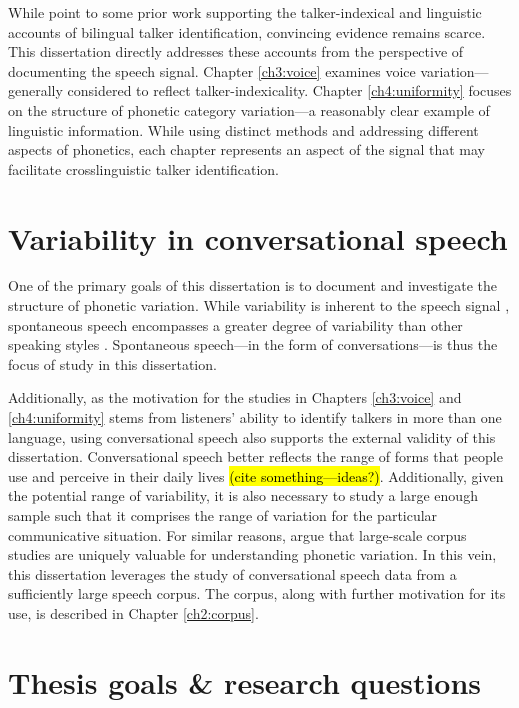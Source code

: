 While \citet{orena_2019_identifying} point to some prior work supporting the talker-indexical and linguistic accounts of bilingual talker identification, convincing evidence remains scarce. This dissertation directly addresses these accounts from the perspective of documenting the speech signal. Chapter \ref{ch3:voice} examines voice variation---generally considered to reflect talker-indexicality. Chapter \ref{ch4:uniformity} focuses on the structure of phonetic category variation---a reasonably clear example of linguistic information. While using distinct methods and addressing different aspects of phonetics, each chapter represents an aspect of the signal that may facilitate crosslinguistic talker identification. 

\section{Variability in conversational speech}\label{ch1:sec:spontaneous}

One of the primary goals of this dissertation is to document and investigate the structure of phonetic variation. While variability is inherent to the speech signal \citep[cf. the lack of invariance problem][]{liberman_1967_perception}, spontaneous speech encompasses a greater degree of variability than other speaking styles \citep[e.g., reduction phenomena:][]{johnson_2004_massive}. Spontaneous speech---in the form of conversations---is thus the focus of study in this dissertation. 

Additionally, as the motivation for the studies in Chapters \ref{ch3:voice} and \ref{ch4:uniformity} stems from listeners' ability to identify talkers in more than one language, using conversational speech also supports the external validity of this dissertation. Conversational speech better reflects the range of forms that people use and perceive in their daily lives \hl{(cite something---ideas?)}. Additionally, given the potential range of variability, it is also necessary to study a large enough sample such that it comprises the range of variation for the particular communicative situation. For similar reasons, \citet{tanner_2020_english} argue that large-scale corpus studies are uniquely valuable for understanding phonetic variation. In this vein, this dissertation leverages the study of conversational speech data from a sufficiently large speech corpus. The corpus, along with further motivation for its use, is described in Chapter \ref{ch2:corpus}.

\section{Thesis goals \& research questions}\label{ch1:sec:goals}

